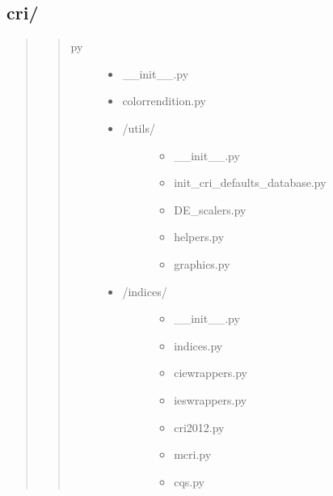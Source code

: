 \documentclass[letterpaper,10pt,english]{sphinxmanual}
\begin{document}
\subsection{cri/}
\label{\detokenize{color:cri}}\begin{quote}
\begin{quote}\begin{description}
\item[{py}] \leavevmode\begin{itemize}
\item {} 
\_\_init\_\_.py

\item {} 
colorrendition.py

\item {} \begin{description}
\item[{/utils/}] \leavevmode\begin{itemize}
\item {} 
\_\_init\_\_.py

\item {} 
init\_cri\_defaults\_database.py

\item {} 
DE\_scalers.py

\item {} 
helpers.py

\item {} 
graphics.py

\end{itemize}

\end{description}

\item {} \begin{description}
\item[{/indices/}] \leavevmode\begin{itemize}
\item {} 
\_\_init\_\_.py

\item {} 
indices.py

\item {} 
ciewrappers.py

\item {} 
ieswrappers.py

\item {} 
cri2012.py

\item {} 
mcri.py

\item {} 
cqs.py


\end{itemize}
\end{description}
\end{itemize}
\end{description}
\end{quote}
\end{quote}
\end{document}
